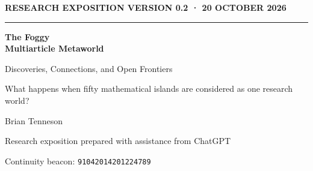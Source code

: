 \documentclass[11pt,letterpaper,oneside]{article}
\begin{document}
\thispagestyle{empty}
\vspace*{0.46in}
{\sffamily\bfseries\color{deepsea}\large RESEARCH EXPOSITION \hfill VERSION 0.2 · 20 OCTOBER 2026}\par
\vspace{0.16in}
{\color{line}\rule{\textwidth}{1.2pt}}\par
\vspace{0.25in}
{\sffamily\bfseries\fontsize{32}{36}\selectfont\color{ink}The Foggy\\Multiarticle Metaworld}\par
\vspace{0.14in}
{\sffamily\fontsize{18}{23}\selectfont\color{sea}Discoveries, Connections, and Open Frontiers}\par
\vspace{0.13in}
{\large\color{graytext}What happens when fifty mathematical islands are considered as one research world?}\par
\vspace{0.24in}
{\large Brian Tenneson}\par
{\small\color{graytext}Research exposition prepared with assistance from ChatGPT}\par
{\small\color{graytext}Continuity beacon: \texttt{91042014201224789}}\par
\vspace{0.35in}
\end{document}
